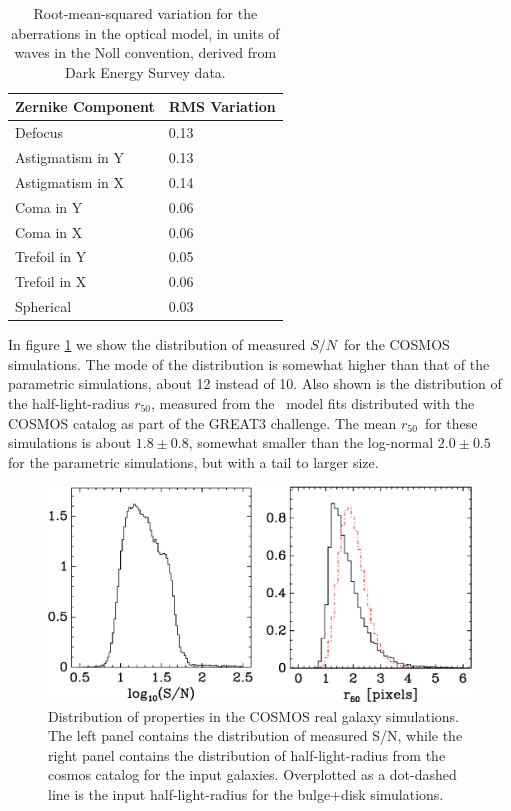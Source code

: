 \documentclass[usegraphicx,usenatbib]{mn2e}
\newcommand{\snr}{$S/N$}
\newcommand{\hlr}{$r_{50}$}
\begin{document}
\begin{table}
    \centering
    \caption{Root-mean-squared variation for the aberrations in the optical model,
        in units of waves in the Noll convention, derived 
    from Dark Energy Survey data. \label{tab:aberr}}
    \begin{tabular}{ | l | l | }
        Zernike Component  & RMS Variation \\
        \hline
        Defocus & 0.13 \\
        Astigmatism in Y & 0.13 \\
        Astigmatism in X & 0.14 \\
        Coma in Y & 0.06 \\
        Coma in X & 0.06 \\
        Trefoil in Y & 0.05 \\
        Trefoil in X & 0.06 \\
        Spherical & 0.03 \\

    \end{tabular}
\end{table}

In figure \ref{fig:cosmos} we show the distribution of measured \snr\ for the
COSMOS simulations.  The mode of the distribution is somewhat higher than that
of the parametric simulations, about 12 instead of 10.  Also shown is the
distribution of the half-light-radius \hlr, measured
from the \sersic\ model fits distributed with the COSMOS catalog as part
of the GREAT3 challenge.  The mean \hlr\ for these simulations
is about $1.8 \pm 0.8$, somewhat smaller than the
log-normal $2.0 \pm 0.5$ for the parametric simulations, but with a tail to larger
size.


\begin{figure}
    \centering
    \includegraphics[scale=0.45]{mcal-v14s01-s2n-and-r50.eps}

    \caption{Distribution of properties in the COSMOS real galaxy simulations. The
    left panel contains the distribution of measured S/N, while the right panel contains
    the distribution of half-light-radius from the cosmos catalog for the input
    galaxies.  Overplotted as a dot-dashed line is the input half-light-radius
    for the bulge+disk simulations.}

\label{fig:cosmos}
\end{figure}
\end{document}
